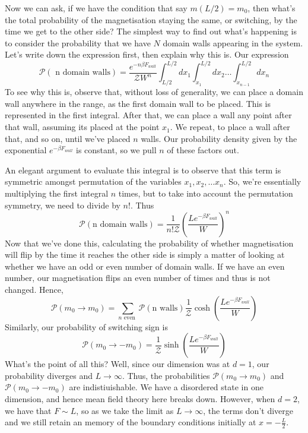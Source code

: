 Now we can ask, if we have the condition that say $ m ( L / 2 ) = m_0 $, 
then what's the total probability of the magnetisation staying the same, 
or switching, by the time we get to the other side? 
The simplest way to find out what's happening is to consider 
the probability that we have $ N $ domain walls appearing in the system. 
Let's write down the expression first, then explain why this is. 
Our expression 
\[
	\mathcal{ P }\left( \text{ n domain walls}  \right)  = \frac{e^{ - n \beta F_{wall}}}{\mathcal{Z} W^n } \int_{L / 2}^{ L / 2 } dx_1 \int_{x_1}^{ L / 2 } dx_2 \dots \int_{ x_{n-1}}^{ L / 2} dx_n  
\] To see why this is, observe that, without loss of generality, we can place a domain wall anywhere
in the range, as the first domain wall to be placed. This is represented in the first integral. 
After that, we can place a wall any point after that wall, assuming 
its placed at the point $ x_{1}$. We repeat, to place a wall after that, and so on, 
until we've placed $n $ walls. 
Our probability density given by the exponential $ e^{ - \beta F_{wall}}$ is constant, so we
pull $ n $ of these factors out. 

An elegant argument to evaluate this integral is to observe that 
this term is symmetric amongst permutation of the variables $ x_1, x_2, \dots x_n $. 
So, we're essentially multiplying the first integral $ n $ times, 
but to take into account the permutation symmetry, we need to 
divide by $ n ! $. 
Thus 
\[
	\mathcal{ P }\left( \text{n domain walls} \right) = \frac{1}{n! \mathcal{ Z}} \left( \frac{L e^{ - \beta F_{wall}}}{ W} \right)^{n }   
\] Now that we've done this, calculating the probability of whether 
magnetisation will flip by the time it reaches the other side 
is simply a matter of looking at whether we have an odd or even 
number of domain walls. If we have an even number, 
our magnetisation flips an even number of times and thus is not changed. Hence, 
\[
	\mathcal{ P }( m_0 \to  m_0 )  = \sum_{n \text{ even }} \mathcal{P }\left( \text{n walls} \right) \frac{1}{\mathcal{Z}} \cosh \left( \frac{L e^{ - \beta F_{wall}}}{ W } \right)  
\] Similarly, our probability of switching sign is 
\[
	\mathcal{ P }( m_{0} \to   - m_0 ) = \frac{1}{\mathcal{ Z}} \sinh \left( \frac{L e^{ - \beta F_{wall}}}{ W} \right) 
\] What's the point of all this? 
Well, since our dimension was at $d = 1$, our probability diverges and $ L \to \infty $.
Thus, the probabilities $ \mathcal{ P }( m_0 \to  m _0 ) $ and $ \mathcal{P }( m_0 \to - m_0 ) $ 
are indistiuishable. 
We have a disordered state in one dimension, and hence mean field theory 
here breaks down. However, when 
$ d = 2$, we have that $ F \sim L $, so as we take the limit
as  $ L \to  \infty $, the terms don't diverge and we still retain an memory of 
the boundary conditions initially at $ x =  - \frac{L}{2}$. 


\pagebreak


